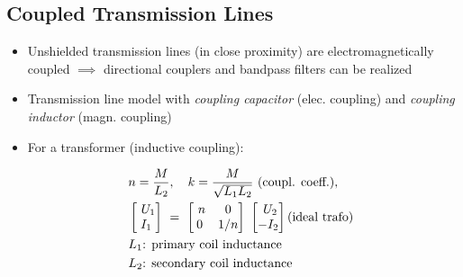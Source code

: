\subsection{Coupled Transmission Lines}
\begin{itemize}
    \itemsep0pt
    \item Unshielded transmission lines (in close proximity) are electromagnetically coupled $\implies$ directional couplers and bandpass filters can be realized
    \item Transmission line model with \textit{coupling capacitor} (elec. coupling) and \textit{coupling inductor} (magn. coupling)
    \item For a transformer (inductive coupling):
        \begin{minipage}{.3\paperheight}
            
        \end{minipage}
        \begin{align*}
            &n = \dfrac{M}{L_2}, \quad k = \dfrac{M}{\sqrt{L_1 L_2}}\text{ (coupl. coeff.)},\\
            &\begin{bmatrix}\
                U_1\\
                I_1
            \end{bmatrix}\
            =\
            \begin{bmatrix}\
                n & 0\\
                0 & 1/n
            \end{bmatrix}\
            \begin{bmatrix}\
                U_2\\
                -I_2
            \end{bmatrix} \parbox{2cm}{(ideal trafo)}\\
            &L_1\text{: primary coil inductance}\\
            &L_2\text{: secondary coil inductance}
        \end{align*}
\end{itemize}

